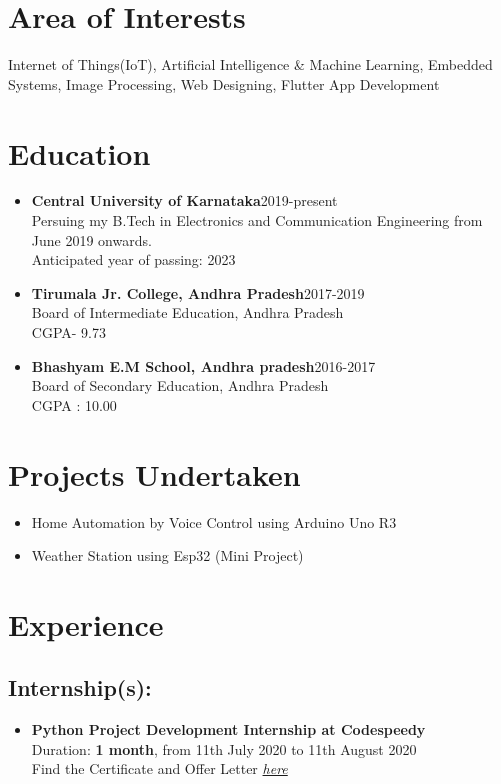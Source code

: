 \documentclass[]{article}
\begin{document}
    \section*{Area of Interests}
    Internet of Things(IoT), Artificial Intelligence \& Machine Learning, Embedded Systems, Image Processing, Web Designing, Flutter App Development
    \section*{Education} %
    \begin{itemize}
        \item \textbf{Central University of Karnataka}\hspace{7.1cm}2019-present\\Persuing my B.Tech in Electronics and Communication Engineering from June 2019 onwards.\\Anticipated year of passing: 2023
        \item \textbf{Tirumala Jr. College, Andhra Pradesh}\hspace{6cm}2017-2019\\Board of Intermediate Education, Andhra Pradesh\\CGPA- 9.73
        \item \textbf{Bhashyam E.M School, Andhra pradesh}\hspace{5.8cm}2016-2017\\Board of Secondary Education, Andhra Pradesh\\CGPA : 10.00
    \end{itemize} %
    \section*{Projects Undertaken}
    \begin{itemize}
        \item Home Automation by Voice Control using Arduino Uno R3
        \item Weather Station using Esp32 (Mini Project)
    \end{itemize}
    \section*{Experience}
    \subsection*{Internship(s):}
    \begin{itemize}
    	\item \textbf{Python Project Development Internship at Codespeedy} \\ Duration: \textbf{1 month}, from 11th July 2020 to 11th August 2020\\ Find the Certificate and Offer Letter \href{https://drive.google.com/drive/u/0/folders/1xYkAyu6kQM1Ie_zidpUTzLilsbwugyiZ}{\em here}
    \end{itemize}
    \newpage
\end{document}
